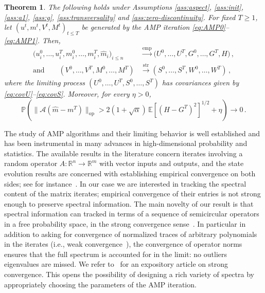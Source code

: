 \documentclass[11pt]{article}
\newtheorem{theorem}{Theorem}[section]
\theoremstyle{definition}
\theoremstyle{remark}
\numberwithin{equation}{section}
\numberwithin{theorem}{section}
\newcommand{\R}{\mathbb R}
\newcommand{\E}{\mathbb E}
\newcommand{\Prob}{\mathbb P}
\newcommand{\op}{\mathrm{op}}
\newcommand{\cA}{\mathcal A}
\begin{document}
\begin{theorem}
\label{thm:main-general}
The following holds under Assumptions \ref{ass:aspect}, \ref{ass:init},
\ref{ass:a1}, \ref{ass:g}, \ref{ass:transversality} and \ref{ass:zero-discontinuity}.  For fixed $T \ge 1$, let $(u^{t},m^{t},V^{t},M^{t})_{t \le T}$ be generated by
the AMP iteration \eqref{eq:AMP0}--\eqref{eq:AMP1}.  Then, 
\begin{align}
  \bigl(u_i^0,\ldots,u_i^{T},m_i^0,\ldots,m_i^{T}, \widehat m_i\bigr)_{i\le n}
  &\xrightarrow{\mathrm{emp}}
  \bigl(U^0,\ldots,U^{T},G^0,\ldots,G^T,H\bigr)\,,\label{eq:vector-SE-main}\\
\mbox{and}\qquad
  (V^0,\ldots,V^T,M^0,\ldots,M^T)
  &\xrightarrow{\mathrm{str}}
  (S^0,\ldots,S^T,W^0,\ldots,W^T)\,,\label{eq:matrix-SE-main}
\end{align}
where the limiting process
$(U^0,\ldots,U^{T},S^0,\ldots,S^T)$ has covariances given by
\eqref{eq:covU}--\eqref{eq:covS}.
Moreover, for every $\eta>0$,
\begin{equation}\label{eq:terminal-comparison-opnorm}
 \Prob\left(
 \bigl\|\cA(\widehat m-m^T)\bigr\|_{\op}
 >
 2(1+\sqrt\alpha)\,
 \E[(H-G^T)^2]^{1/2}
 +\eta
 \right)
 \longrightarrow 0\,.
\end{equation}
\end{theorem}


The study of AMP algorithms and their limiting behavior is well established and has been instrumental in many advances in high-dimensional probability and statistics. The available results in the literature concern iterates involving a random operator $A : \R^n \to \R^m$ with vector inputs and outputs, and the state evolution results are concerned with establishing empirical convergence on both sides; see for instance~\cite{javanmard2013hypothesis,bolthausen2014iterative,berthier2017state}. In our case we are interested in tracking the spectral content of the matrix iterates; empirical convergence of their entries is not strong enough to preserve spectral information. The main novelty of our result is that spectral information can tracked in terms of a sequence of semicircular operators in a free probability space, in the strong convergence sense~\cite{voiculescu1991limit,haagerup2005new,mingo2017free,van2025strong}. In particular in addition to asking for convergence of normalized traces of arbitrary polynomials in the iterates (i.e., weak convergence~\cite{voiculescu1991limit,mingo2017free}), the convergence of operator norms ensures that the full spectrum is accounted for in the limit: no outliers eigenvalues are missed. We refer to~\cite{van2025strong} for an expository article on strong convergence. 
This opens the possibility of designing a rich variety of spectra by appropriately choosing the parameters of the AMP iteration.     
            
\end{document}

